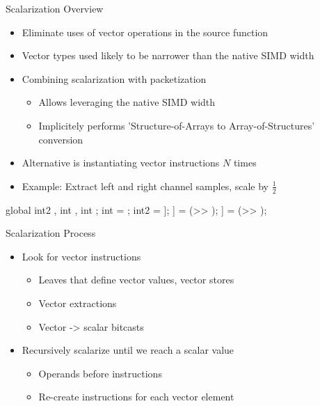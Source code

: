
\begin{frame}[fragile]{Scalarization Overview}

\begin{itemize}
    \item Eliminate uses of vector operations in the source function
    \item Vector types used likely to be narrower than the native SIMD width
    \item Combining scalarization with packetization
    \begin{itemize}
        \item Allows leveraging the native SIMD width
        \item Implicitely performs 'Structure-of-Arrays to Array-of-Structures' conversion
    \end{itemize}
    \item Alternative is instantiating vector instructions $N$ times
    \item Example: Extract left and right channel samples, scale by $\frac{1}{2}$
\end{itemize}

\begin{codebox}[commandchars=\\\[\]]
    
global int2 \uniform[*src], int \uniform[*left], int \uniform[*right];
int \varying[tid] = ;
int2 \varying[sample] = \uniform[src]\idx[\varying[tid]];
\uniform[left]\idx[\varying[tid]] = (\varying[sample.x] >> \uniform[1]);
\uniform[right]\idx[\varying[tid]] = (\varying[sample.y] >> \uniform[1]);
\end{codebox}

\end{frame}


\begin{frame}{Scalarization Process}

\begin{itemize}
    \item Look for vector instructions
    \begin{itemize}
        \item Leaves that define vector values, vector stores
        \item Vector extractions
        \item Vector -> scalar bitcasts
    \end{itemize}
    
    \item Recursively scalarize until we reach a scalar value
    \begin{itemize}
        \item Operands before instructions
        \item Re-create instructions for each vector element
    \end{itemize}
    
\end{itemize}

\end{frame}

